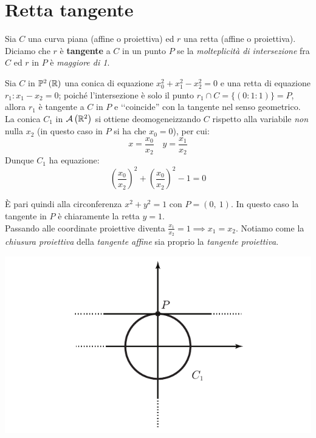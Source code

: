 \section{Retta tangente}
\begin{define}
Sia $C$ una curva piana (affine o proiettiva) ed $r$ una retta (affine o proiettiva). Diciamo che $r$ è \textbf{tangente}  a $C$ in un punto $P$ se la \textit{molteplicità di intersezione} fra $C$ ed $r$ in $P$ è \textit{maggiore di 1}.
\end{define}
\begin{example}	Sia $C$ in $\proj[2]{\realset}$ una conica di equazione $x_0^2+x_1^2-x_2^2=0$ e una retta di equazione $r_1\colon x_1-x_2=0$; poiché l'intersezione è solo il punto $r_1\cap C=\{(0\colon 1\colon 1)\}=P$, allora $r_1$ è tangente a $C$ in $P$ e ‘‘coincide'' con la tangente nel senso geometrico.\\
La conica $C_1$ in ${\mathcal{A}\left(\mathbb{R}^2\right)}$ si ottiene deomogeneizzando $C$ rispetto alla variabile \textit{non} nulla $x_2$ (in questo caso in $P$ si ha che $x_0=0$), per cui:
\begin{equation*}
		x=\frac{x_0}{x_2}\quad y=\frac{x_1}{x_2}
	\end{equation*}
	Dunque $C_1$ ha equazione:
	\begin{equation*}
		\left( \frac{x_0}{x_2} \right)^2 + \left( \frac{x_0}{x_2} \right)^2 -1 =0
	\end{equation*}
\begin{minipage}{0.75\textwidth}
È pari quindi alla circonferenza $x^2+y^2=1$ con $P=(0,\ 1)$. In questo caso la tangente in $P$ è chiaramente la retta $y=1$.\\
Passando alle coordinate proiettive diventa $\frac{x_1}{x_2}=1 \implies x_1=x_2$. Notiamo come la \textit{chiusura proiettiva} della \textit{tangente affine} sia proprio la \textit{tangente proiettiva}.
\end{minipage}
\hspace{-12mm}
\begin{minipage}{0.24\textwidth}
	\includegraphics[trim=0cm 0cm 0cm 0cm,clip,scale=0.50]{images/planecurve1.pdf}
\end{minipage}
\end{example}
